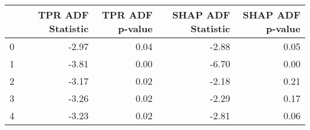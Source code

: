 \begin{tabular}{lrrrr}
\toprule
 & TPR ADF Statistic & TPR ADF p-value & SHAP ADF Statistic & SHAP ADF p-value \\
\midrule
0 & -2.97 & 0.04 & -2.88 & 0.05 \\
1 & -3.81 & 0.00 & -6.70 & 0.00 \\
2 & -3.17 & 0.02 & -2.18 & 0.21 \\
3 & -3.26 & 0.02 & -2.29 & 0.17 \\
4 & -3.23 & 0.02 & -2.81 & 0.06 \\
\bottomrule
\end{tabular}
